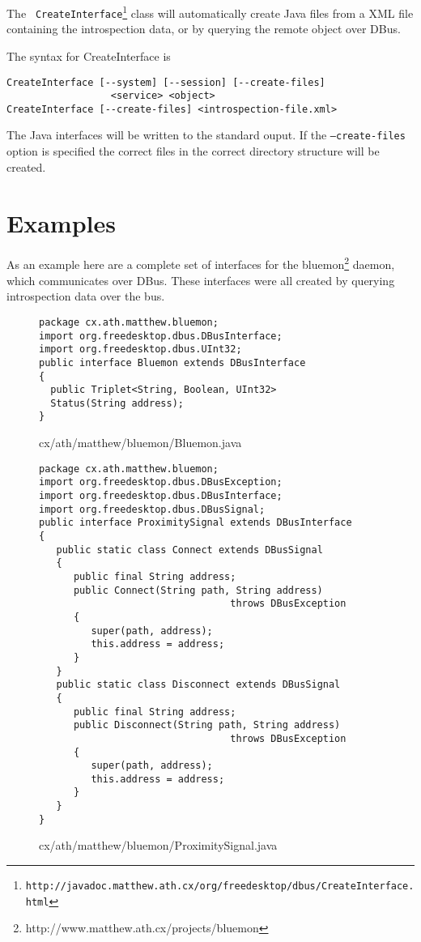 \documentclass[a4paper,12pt]{article}
\begin{document}
The {\tt
CreateInterface\footnote{http://javadoc.matthew.ath.cx/org/freedesktop/dbus/CreateInterface.html}}
class will automatically create Java files from a XML file
containing the introspection data, or by querying the remote object
over DBus.

The syntax for CreateInterface is

\begin{verbatim}
CreateInterface [--system] [--session] [--create-files] 
                  <service> <object>
CreateInterface [--create-files] <introspection-file.xml>
\end{verbatim}

The Java interfaces will be written to the standard ouput. If the
{\tt --create-files} option is specified the correct files in the
correct directory structure will be created.

\section{Examples}

As an example here are a complete set of interfaces for the
bluemon\footnote{http://www.matthew.ath.cx/projects/bluemon} daemon,
which communicates over DBus. These interfaces were all created by
querying introspection data over the bus.

\newpage

\begin{figure}[!h]
\begin{center}
\begin{verbatim}
package cx.ath.matthew.bluemon;
import org.freedesktop.dbus.DBusInterface;
import org.freedesktop.dbus.UInt32;
public interface Bluemon extends DBusInterface
{
  public Triplet<String, Boolean, UInt32> 
  Status(String address);
}
\end{verbatim}
\end{center}
\caption{cx/ath/matthew/bluemon/Bluemon.java}
\end{figure}

\newpage

\begin{figure}[!h]
\begin{center}
\begin{verbatim}
package cx.ath.matthew.bluemon;
import org.freedesktop.dbus.DBusException;
import org.freedesktop.dbus.DBusInterface;
import org.freedesktop.dbus.DBusSignal;
public interface ProximitySignal extends DBusInterface
{
   public static class Connect extends DBusSignal
   {
      public final String address;
      public Connect(String path, String address) 
                                 throws DBusException
      {
         super(path, address);
         this.address = address;
      }
   }
   public static class Disconnect extends DBusSignal
   {
      public final String address;
      public Disconnect(String path, String address)
                                 throws DBusException
      {
         super(path, address);
         this.address = address;
      }
   }
}
\end{verbatim}
\end{center}
\caption{cx/ath/matthew/bluemon/ProximitySignal.java}
\end{figure}
\end{document}
